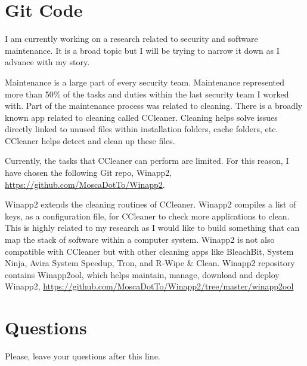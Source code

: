 \section{Git Code}
I am currently working on a research related to security and software maintenance. It is a broad topic but I will be trying to narrow it down as I advance with my story.

Maintenance is a large part of every security team. Maintenance represented more than 50\% of the tasks and duties within the last security team I worked with. Part of the maintenance process was related to cleaning. There is a broadly known app related to cleaning called CCleaner. Cleaning helps solve issues directly linked to unused files within installation folders, cache folders, etc. CCleaner helps detect and clean up these files.

Currently, the tasks that CCleaner can perform are limited. For this reason, I have chosen the following Git repo, Winapp2, \url{https://github.com/MoscaDotTo/Winapp2}.

Winapp2 extends the cleaning routines of CCleaner. Winapp2 compiles a list of keys, as a configuration file, for CCleaner to check more applications to clean.
This is highly related to my research as I would like to build something that can map the stack of software within a computer system.
Winapp2 is not also compatible with CCleaner but with other cleaning apps like BleachBit, System Ninja, Avira System Speedup, Tron, and R-Wipe \& Clean. Winapp2 repository contains Winapp2ool, which helps maintain, manage, download and deploy Winapp2, \url{https://github.com/MoscaDotTo/Winapp2/tree/master/winapp2ool}


\section{Questions}
Please, leave your questions after this line.






%
